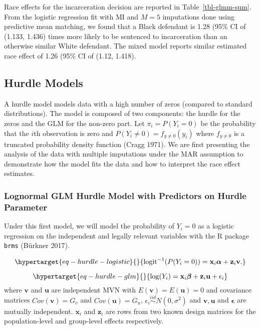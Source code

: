 \documentclass[
  letterpaper,
  DIV=11,
  numbers=noendperiod]{scrartcl}
\begin{document}
Race effects for the incarceration decision are reported in
Table~\ref{tbl-glmm-sum}. From the logistic regression fit with MI and
\(M = 5\) imputations done using predictive mean matching, we found that
a Black defendant is 1.28 (95\% CI of (1.133, 1.436) times more likely
to be sentenced to incarceration than an otherwise similar White
defendant. The mixed model reports similar estimated race effect of 1.26
(95\% CI of (1.12, 1.418).

\hypertarget{hurdle-models}{%
\subsection{Hurdle Models}\label{hurdle-models}}

A hurdle model models data with a high number of zeros (compared to
standard distributions). The model is composed of two components: the
hurdle for the zeros and the GLM for the non-zero part. Let
\(\pi_i = P(Y_i = 0)\) be the probability that the \(i\)th observation
is zero and \(P(Y_i \neq 0) = f_{y\neq 0}(y_i)\) where \(f_{y\neq 0}\)
is a truncated probability density function (Cragg 1971). We are first
presenting the analysis of the data with multiple imputations under the
MAR assumption to demonstrate how the model fits the data and how to
interpret the race effect estimates.

\hypertarget{lognormal-glm-hurdle-model-with-predictors-on-hurdle-parameter}{%
\subsubsection{Lognormal GLM Hurdle Model with Predictors on Hurdle
Parameter}\label{lognormal-glm-hurdle-model-with-predictors-on-hurdle-parameter}}

Under this first model, we will model the probability of \(Y_i = 0\) as
a logistic regression on the independent and legally relevant variables
with the R package \texttt{brms} (Bürkner 2017).

\begin{equation}\protect\hypertarget{eq-hurdle-logistic}{}{
\mathrm{logit}^{-1}(P(Y_i = 0)) = \mathbf{x}_i \boldsymbol{\alpha} + \mathbf{z}_i \mathbf{v}.
}\label{eq-hurdle-logistic}\end{equation}

\begin{equation}\protect\hypertarget{eq-hurdle-glm}{}{
\log(Y_i) = \mathbf{x}_i \boldsymbol{\beta} + \mathbf{z}_i \mathbf{u} + \epsilon_i
}\label{eq-hurdle-glm}\end{equation} where \(\mathbf{v}\) and
\(\mathbf{u}\) are independent MVN with
\(E(\mathbf{v}) = E(\mathbf{u}) = 0\) and covariance matrices
\(Cov(\mathbf{v}) = G_v\) and \(Cov(\mathbf{u}) = G_u\),
\(\epsilon_i \overset{iid}{\sim} N(0, \sigma^2)\) and
\(\mathbf{v}, \mathbf{u}\) and \(\boldsymbol{\epsilon}\) are mutually
independent. \(\mathbf{x}_i\) and \(\mathbf{z}_i\) are rows from two
known design matrices for the population-level and group-level effects
respectively.
\end{document}
